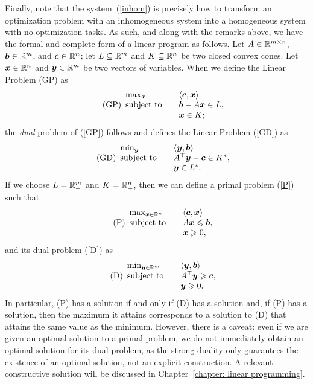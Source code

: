 Finally, note that the system~(\ref{inhom}) is precisely how to transform an optimization problem with an inhomogeneous system into a homogeneous system with no optimization tasks. As such, and along with the remarks above, we have the formal and complete form of a linear program as follows. Let $A\in\mathbb R^{m\times n}$, ${\boldsymbol b}\in\mathbb R^m$, and ${\boldsymbol c}\in\mathbb R^n$; let $L\subseteq \mathbb R^m$ and $K\subseteq \mathbb R^n$ be two closed convex cones. Let ${\boldsymbol x}\in\mathbb R^n$ and ${\boldsymbol y}\in\mathbb R^m$ be two vectors of variables. When we define the Linear Problem (GP) as 
\begin{equation}\label{GP}\tag{GP}
\begin{array}{ll}
\mathrm{max}_{{\boldsymbol x}}  \quad & \left\langle{\boldsymbol c}, {\boldsymbol x}\right\rangle\\
\text{subject to} \quad & {\boldsymbol b} - A{\boldsymbol x}  \in L, \\
& {\boldsymbol x}\in K; 
\end{array}
\end{equation}
the {\em dual} problem of (\ref{GP}) follows and defines the Linear Problem (\ref{GD}) as
 \begin{equation}\label{GD}\tag{GD}
\begin{array}{ll}
\mathrm{min}_{{\boldsymbol y}}  \quad & \left\langle{\boldsymbol y}, {\boldsymbol b}\right\rangle\\
\text{subject to} \quad & A^\top{\boldsymbol y}  - {\boldsymbol c}  \in K^\ast, \\
& {\boldsymbol y}\in L^\ast.
\end{array} 
\end{equation}
If we choose $L = \mathbb R^m_+$ and $K = \mathbb R^n_+$, then we can define a primal problem (\ref{P}) such that 
\begin{equation}\label{P}\tag{P}
\begin{array}{ll}
\mathrm{max}_{{\boldsymbol x}\in\mathbb R^n}  \quad & \left\langle{\boldsymbol c}, {\boldsymbol x}\right\rangle\\
\text{subject to} \quad & A{\boldsymbol x}  \leqslant {\boldsymbol b}, \\
& {\boldsymbol x}\geqslant 0, 
\end{array}
\end{equation}
and its dual problem (\ref{D}) as 
 \begin{equation}\label{D}\tag{D}
\begin{array}{ll}
\mathrm{min}_{{\boldsymbol y}\in\mathbb R^m}  \quad & \left\langle{\boldsymbol y}, {\boldsymbol b}\right\rangle\\
\text{subject to} \quad & A^\top{\boldsymbol y}  \geqslant {\boldsymbol c}, \\
& {\boldsymbol y}\geqslant 0.
\end{array} 
\end{equation}
In particular, (P) has a solution if and only if (D) has a solution and, if (P) has a solution, then the maximum it attains corresponds to a solution to (D) that attains the same value as the minimum. However, there is a caveat: even if we are given an optimal solution to a primal problem, we do not immediately obtain an optimal solution for its dual problem, as the strong duality only guarantees the existence of an optimal solution, not an explicit construction. A relevant constructive solution will be discussed in Chapter~\ref{chapter: linear programming}. 

